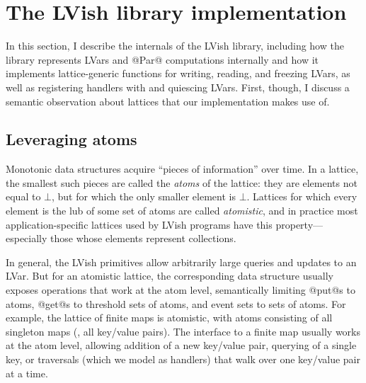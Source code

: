 \section{The LVish library implementation}\label{s:lvish-internals}


In this section, I describe the internals of the LVish library,
including how the library represents LVars and @Par@ computations
internally and how it implements lattice-generic functions for
writing, reading, and freezing LVars, as well as registering handlers
with and quiescing LVars.  First, though, I discuss a semantic
observation about lattices that our implementation makes use of.

\subsection{Leveraging atoms}\label{subsection:lvish-leveraging-atoms}

Monotonic data structures acquire ``pieces of information'' over time.
In a lattice, the smallest such pieces are called the \emph{atoms} of
the lattice: they are elements not equal to $\bot$, but for which the
only smaller element is $\bot$.  Lattices for which every element is
the lub of some set of atoms are called \emph{atomistic}, and in
practice most application-specific lattices used by LVish programs
have this property---especially those whose elements represent
collections.

In general, the LVish primitives allow arbitrarily large queries and
updates to an LVar.  But for an atomistic lattice, the corresponding
data structure usually exposes operations that work at the atom level,
semantically limiting @put@s to atoms, @get@s to threshold sets of
atoms, and event sets to sets of atoms.  For example, the lattice of
finite maps is atomistic, with atoms consisting of all singleton maps
(\ie, all key/value pairs).  The interface to a finite map usually
works at the atom level, allowing addition of a new key/value pair,
querying of a single key, or traversals (which we model as handlers)
that walk over one key/value pair at a time.

